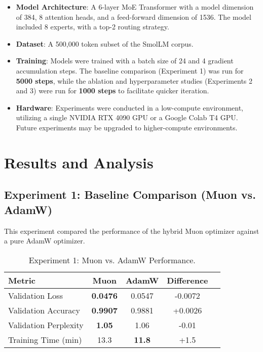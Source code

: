 \documentclass[11pt, a4paper]{article}
\begin{document}
\begin{itemize}
    \item \textbf{Model Architecture}: A 6-layer MoE Transformer with a model dimension of 384, 8 attention heads, and a feed-forward dimension of 1536. The model included 8 experts, with a top-2 routing strategy.
    \item \textbf{Dataset}: A 500,000 token subset of the SmolLM corpus.
    \item \textbf{Training}: Models were trained with a batch size of 24 and 4 gradient accumulation steps. The baseline comparison (Experiment 1) was run for \textbf{5000 steps}, while the ablation and hyperparameter studies (Experiments 2 and 3) were run for \textbf{1000 steps} to facilitate quicker iteration.

    \item \textbf{Hardware}: Experiments were conducted in a low-compute environment, utilizing a single NVIDIA RTX 4090 GPU or a Google Colab T4 GPU. Future experiments may be upgraded to higher-compute environments.
\end{itemize}

\section{Results and Analysis}

\subsection{Experiment 1: Baseline Comparison (Muon vs. AdamW)}
This experiment compared the performance of the hybrid Muon optimizer against a pure AdamW optimizer.

\begin{table}[h!]
\centering
\caption{Experiment 1: Muon vs. AdamW Performance.}
\label{tab:exp1}
\begin{tabular}{@{}lcccc@{}}
\toprule
Metric & Muon & AdamW & Difference \\ \midrule
Validation Loss & \textbf{0.0476} & 0.0547 & -0.0072 \\
Validation Accuracy & \textbf{0.9907} & 0.9881 & +0.0026 \\
Validation Perplexity & \textbf{1.05} & 1.06 & -0.01 \\
Training Time (min) & 13.3 & \textbf{11.8} & +1.5 \\ \bottomrule
\end{tabular}
\end{table}
\end{document}
